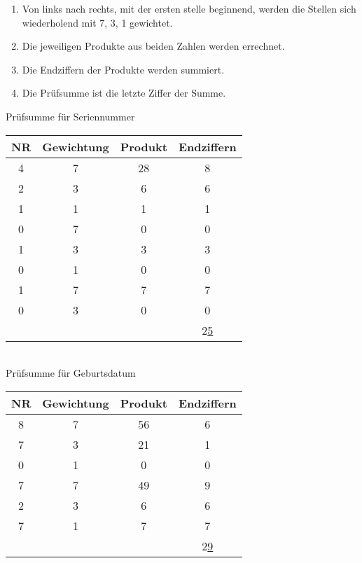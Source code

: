 \documentclass[ngerman]{scrartcl}
\begin{document}
\begin{enumerate}[label=\alph*)]
  \begin{enumerate}[label=\arabic*)]
    \item Von links nach rechts, mit der ersten stelle beginnend, werden die Stellen sich wiederholend mit 7, 3, 1 gewichtet.
    \item Die jeweiligen Produkte aus beiden Zahlen werden errechnet.
    \item Die Endziffern der Produkte werden summiert.
    \item Die Prüfsumme ist die letzte Ziffer der Summe.
  \end{enumerate}
  \pagebreak
  Prüfsumme für Seriennummer \\

  \begin{tabular}{|*{4}{c |}}
    \hline
    NR & Gewichtung & Produkt & Endziffern     \\
    \hline
    4  & 7          & 28      & 8              \\
    2  & 3          & 6       & 6              \\
    1  & 1          & 1       & 1              \\
    0  & 7          & 0       & 0              \\
    1  & 3          & 3       & 3              \\
    0  & 1          & 0       & 0              \\
    1  & 7          & 7       & 7              \\
    0  & 3          & 0       & 0              \\
    \hline
       &            &         & 2\underline{5} \\
    \hline
  \end{tabular} \\

  Prüfsumme für Geburtsdatum \\

  \begin{tabular}{|*{4}{c |}}
    \hline
    NR & Gewichtung & Produkt & Endziffern     \\
    \hline
    8  & 7          & 56      & 6              \\
    7  & 3          & 21      & 1              \\
    0  & 1          & 0       & 0              \\
    7  & 7          & 49      & 9              \\
    2  & 3          & 6       & 6              \\
    7  & 1          & 7       & 7              \\
    \hline
       &            &         & 2\underline{9} \\
    \hline
  \end{tabular} \\


\end{enumerate}
\end{document}
